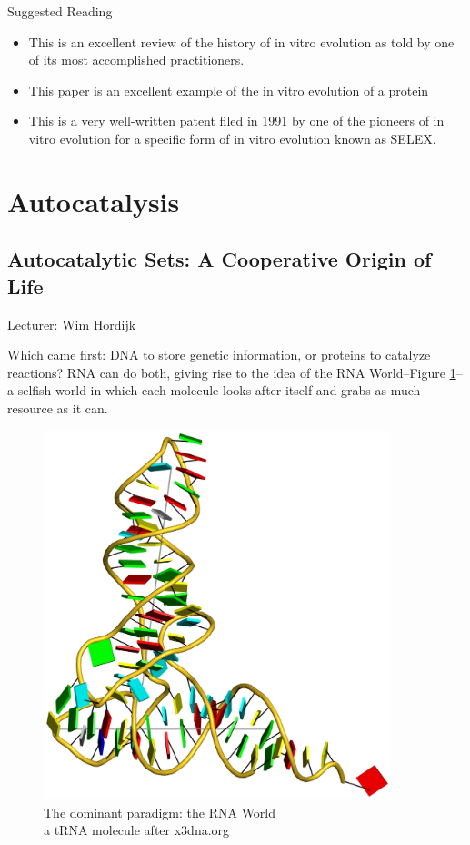 \documentclass[]{article}
\begin{document}
Suggested Reading
\begin{itemize}
	\item \cite{joyce2007forty}This is an excellent review of the history of in vitro evolution as told by one of its most accomplished practitioners.
	\item \cite{seelig2007selection} This paper is an excellent example of the in vitro evolution of a protein
	\item \cite{chen2007ribozyme} This is a very well-written patent filed in 1991 by one of the pioneers of in
	vitro evolution for a specific form of in vitro evolution known as SELEX.
\end{itemize}


\section{Autocatalysis}

\subsection{Autocatalytic Sets: A Cooperative Origin of Life}

Lecturer: Wim Hordijk

Which came first: DNA to store genetic information, or proteins to catalyze reactions? RNA can do both, giving rise to the idea of the RNA World--Figure \ref{fig:RNA}--a selfish world in which each molecule looks after itself and grabs as much resource as it can.

\begin{figure}[H]
	\caption{The dominant paradigm: the RNA World\\a tRNA molecule after x3dna.org}\label{fig:RNA}
	\includegraphics[width=0.9\textwidth]{RNA}
\end{figure}
\end{document}
